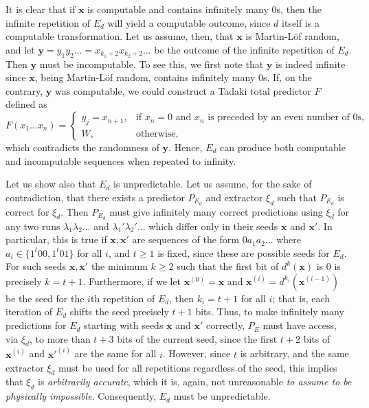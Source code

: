 \documentclass[%
 superscriptaddress,
 preprint,
 showpacs,
 showkeys,
 preprintnumbers,
 nofootinbib,
  amsmath,amssymb,
  aps,
 pra,
  longbibliography,
  floatfix,
 ]{revtex4-1}
\theoremstyle{definition}
\newcommand{\x}{\mathbf{x}}
\newcommand{\y}{\mathbf{y}}
\begin{document}
It is clear that if $\x$ is computable and contains infinitely many 0s, then the infinite repetition of $E_d$ will yield a computable outcome, since $d$ itself is a computable transformation.
Let us assume, then, that $\x$ is Martin-L\"of random, and let $\y=y_1 y_2\dots = x_{k_1+2}x_{k_2+2}\dots$ be the outcome of the infinite repetition of $E_d$.
Then $\y$ must be incomputable.
To see this, we first note that $\y$ is indeed infinite since $\x$, being Martin-L\"of random, contains infinitely many 0s.
If, on the contrary, $\y$ was computable, we could construct a Tadaki total predictor $F$ defined as 
$$
F(x_1\dots x_n) = 
\begin{cases}
y_{j} = x_{n+1}, & \text{if $x_n=0$ and $x_n$ is preceded by an even number of 0s,}\\
W, & \text{otherwise,}
\end{cases}
$$
which contradicts the randomness of $\y$.
Hence, $E_d$ can produce both computable and incomputable sequences when repeated to infinity.
\fi

Let us show also that $E_d$ is unpredictable.
Let us assume, for the sake of contradiction, that there exists a predictor $P_{E_d}$ and extractor $\xi_d$ such that $P_{E_d}$ is correct for $\xi_d$.
Then $P_{E_d}$ must give infinitely many correct predictions using $\xi_d$ for any two runs $\lambda_1\lambda_2\dots$ and $\lambda_1'\lambda_2'\dots$ which differ only in their seeds $\x$ and $\x'$.
In particular, this is true if $\x,\x'$ are sequences of the form $0a_1a_2\dots$ where $a_i\in\{1^t00,1^t01\}$ for all $i$, and $t\ge 1$ is fixed, since these are possible seeds for $E_d$.
For such seeds $\x,\x'$ the minimum $k\ge 2$ such that the first bit of $d^k(\x)$ is 0 is precisely $k=t+1$.
Furthermore, if we let $\x^{(0)}=\x$ and $\x^{(i)}=d^{k_i}\left(\x^{(i-1)}\right)$ be the seed for the $i$th repetition of $E_d$, then $k_i=t+1$ for all $i$; that is, each iteration of $E_d$ shifts the seed precisely $t+1$ bits.
Thus, to make infinitely many predictions for $E_d$ starting with seeds $\x$ and $\x'$ correctly, $P_E$ must have access, via $\xi_d$, to more than $t+3$ bits of the current seed, since the first $t+2$ bits of $\x^{(i)}$ and $\x'^{(i)}$ are the same for all $i$.
However, since $t$ is arbitrary, and the same extractor $\xi_d$ must be used for all repetitions regardless of the seed, this implies that $\xi_d$ is \emph{arbitrarily accurate}, which it is, again, not unreasonable  \emph{to assume to be physically impossible}. Consequently, $E_d$ must be unpredictable.
\end{document}
